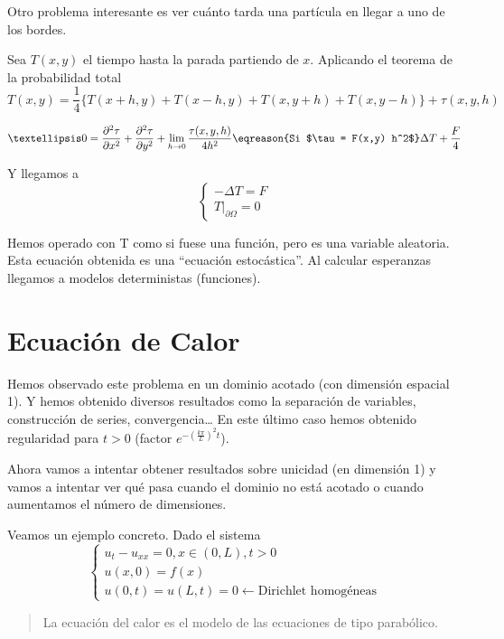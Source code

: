 \begin{example}
		Otro problema interesante es ver cuánto tarda una partícula en llegar a uno de los bordes.

		\noindent Sea $T(x,y)$ el tiempo hasta la parada partiendo de $x$. Aplicando el teorema de la probabilidad total
		\[ T(x,y) = \frac{1}{4} \{ T(x+h,y) + T(x-h,y) + T(x,y+h) + T(x,y-h) \} + \tau(x,y,h)\]

		\[ … 0 = \frac{\partial^2\tau}{\partial x^2} + \frac{\partial^2 \tau}{\partial y^2} + \lim_{h \to 0} \frac{\tau(x,y,h)}{4h^2} \eqreason{Si $\tau = F(x,y) h^2$} \Delta T + \frac{F}{4} \]

		Y llegamos a
		\[ \begin{cases}
			-\Delta T = F \\
			T |_{\partial \Omega} = 0
		\end{cases}\]
		\end{example}
		\obs Hemos operado con T como si fuese una función, pero es una variable aleatoria. Esta ecuación obtenida es una ``ecuación estocástica''. Al calcular esperanzas llegamos a modelos deterministas (funciones).


\section{Ecuación de Calor}

	Hemos observado este problema en un dominio acotado (con dimensión espacial 1). Y hemos obtenido diversos resultados como la separación de variables, construcción de series, convergencia… En este último caso hemos obtenido regularidad para $t > 0$ (factor $e^{-\left(\frac{k \pi}{L}\right)^2 t}$).

	Ahora vamos a intentar obtener resultados sobre unicidad (en dimensión 1) y vamos a intentar ver qué pasa cuando el dominio no está acotado o cuando aumentamos el número de dimensiones.

	Veamos un ejemplo concreto. Dado el sistema \[ \begin{cases}
		u_{t} - u_{xx} = 0, x \in (0,L), t > 0 \\
		u(x,0) = f(x) \\
		u(0,t) = u(L,t) = 0 \leftarrow \text{Dirichlet homogéneas}
	 \end{cases}\]

	 \begin{quote}
		La ecuación del calor es el modelo de las ecuaciones de tipo parabólico.
	 \end{quote}

